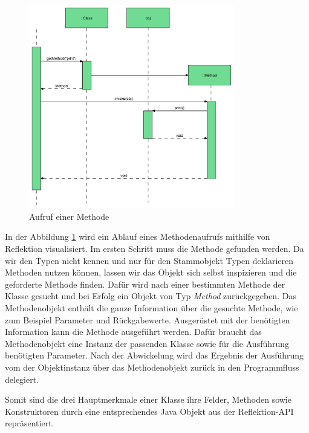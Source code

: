   \begin{figure}[h!]
    \centering
    \includegraphics[width=0.8\textwidth]{material/images/flussReflection.pdf}
    \caption{Aufruf einer Methode \cite{Forman04javareflection}}
    \label{fig:refl-fluss}
  \end{figure}

  In der Abbildung \ref{fig:refl-fluss} wird ein Ablauf eines Methodenaufrufs mithilfe von Reflektion visualisiert. Im ersten Schritt muss die Methode gefunden werden. Da wir den Typen nicht kennen und nur für den Stammobjekt Typen deklarieren Methoden nutzen können, lassen wir das Objekt sich selbst inspizieren und die geforderte Methode finden. Dafür wird nach einer bestimmten Methode der Klasse gesucht und bei Erfolg ein Objekt von Typ \textit{Method} zurückgegeben. Das Methodenobjekt enthält die ganze Information über die gesuchte Methode, wie zum Beispiel Parameter und Rückgabewerte. Ausgerüstet mit der benötigten Information kann die Methode ausgeführt werden. Dafür braucht das Methodenobjekt eine Instanz der passenden Klasse sowie für die Ausführung benötigten Parameter. Nach der Abwickelung wird das Ergebnis der Ausführung vom der Objektinstanz über das Methodenobjekt zurück in den Programmfluss delegiert. \cite{Forman04javareflection} 

  \bigbreak Somit sind die drei Hauptmerkmale einer Klasse ihre Felder, Methoden sowie Konstruktoren durch eine entsprechendes Java Objekt aus der Reflektion-API repräsentiert. 

